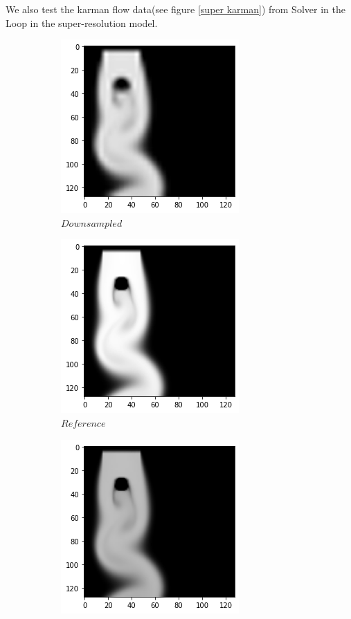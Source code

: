 \documentclass[a4paper,12pt,twoside]{report}
\begin{document}
We also test the karman flow data(see figure \ref{super karman}) from Solver in the Loop in the super-resolution model. 
\begin{figure}
	\centering
	\begin{subfigure}{0.32\textwidth}
		\centering
		\includegraphics[scale=0.5]{superresolution/karman_down.png}
		\caption{$Downsampled$}
	\end{subfigure}
	\begin{subfigure}{0.32\textwidth}
		\centering
		\includegraphics[scale=0.5]{superresolution/karman_ref.png}
		\caption{$Reference$}
	\end{subfigure}
	\begin{subfigure}{0.32\textwidth}
		\centering
		\includegraphics[scale=0.5]{superresolution/karman_mse.png}

\end{subfigure}
\end{figure}
\end{document}
